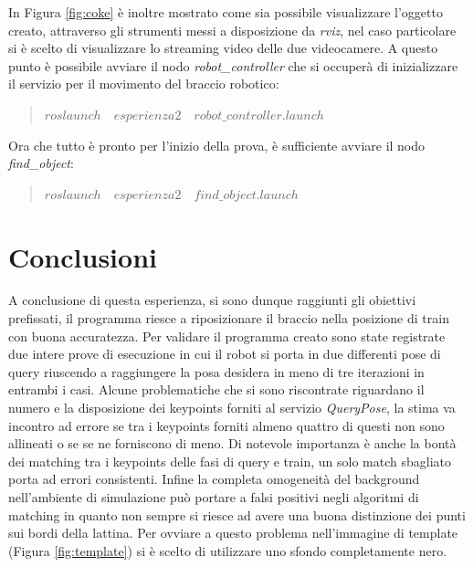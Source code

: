 \documentclass[english]{article}
\begin{document}
In Figura \ref{fig:coke} è inoltre mostrato come sia possibile visualizzare l'oggetto creato, attraverso gli strumenti messi a disposizione da \textit{rviz}, nel caso particolare si è scelto di visualizzare lo streaming video delle due videocamere.
A questo punto è possibile avviare il nodo \textit{robot\_controller} che si occuperà di inizializzare il servizio per il movimento del braccio robotico:
\begin{verse}
\item $ roslaunch \quad  esperienza2 \quad robot\_controller.launch $
\item 
\end{verse}
Ora che tutto è pronto per l'inizio della prova, è sufficiente avviare il nodo \textit{find\_object}:
\begin{verse}
\item $ roslaunch \quad  esperienza2 \quad find\_object.launch $
\item 
\end{verse}

\section{Conclusioni}
A conclusione di questa esperienza, si sono dunque raggiunti gli obiettivi prefissati, il programma riesce a riposizionare il braccio nella posizione di train con buona accuratezza. Per validare il programma creato sono state registrate due intere prove di esecuzione in cui il robot si porta in due differenti pose di query riuscendo a raggiungere la posa desidera in meno di tre iterazioni in entrambi i casi. Alcune problematiche che si sono riscontrate riguardano il numero e la disposizione dei keypoints forniti al servizio \textit{QueryPose}, la stima va incontro ad errore se tra i keypoints forniti almeno quattro di questi non sono allineati o se se ne forniscono di meno. Di notevole importanza è anche la bontà dei matching tra i keypoints delle fasi di query e train, un solo match sbagliato porta ad errori consistenti. Infine la completa omogeneità del background nell'ambiente di simulazione può portare a falsi positivi negli algoritmi di matching in quanto non sempre si riesce ad avere una buona distinzione dei punti sui bordi della lattina. Per ovviare a questo problema nell'immagine di template (Figura \ref{fig:template}) si è scelto di utilizzare uno sfondo completamente nero.


\clearpage
\end{document}
